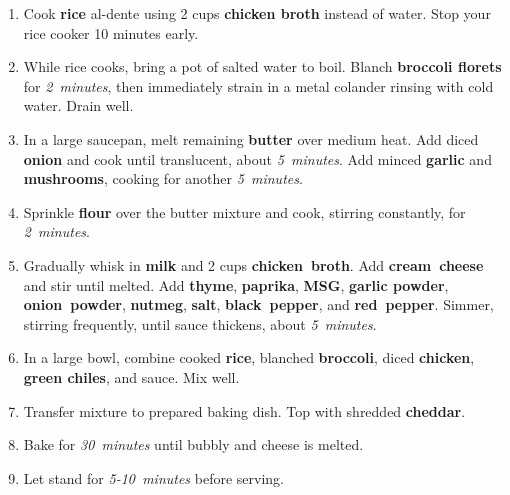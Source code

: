 \documentclass[11pt,letterpaper]{article}
\begin{document}
\begin{enumerate}
    \item Cook \textbf{rice} al-dente using 2 cups \textbf{chicken broth} instead of water. Stop your rice cooker 10 minutes early.
    
    \item While rice cooks, bring a pot of salted water to boil. Blanch \textbf{broccoli florets} for \textit{2~minutes}, then immediately strain in a metal colander rinsing with cold water. Drain well.
    
    \item In a large saucepan, melt remaining \textbf{butter} over medium heat. Add diced \textbf{onion} and cook until translucent, about \textit{5~minutes}. Add minced \textbf{garlic} and \textbf{mushrooms}, cooking for another \textit{5~minutes}.
    
    \item Sprinkle \textbf{flour} over the butter mixture and cook, stirring constantly, for \textit{2~minutes}.
    
    \item Gradually whisk in \textbf{milk} and 2 cups \textbf{chicken~broth}. Add \textbf{cream~cheese} and stir until melted. Add \textbf{thyme}, \textbf{paprika}, \textbf{MSG}, \textbf{garlic powder}, \textbf{onion~powder}, \textbf{nutmeg}, \textbf{salt},  \textbf{black~pepper}, and \textbf{red~pepper}. Simmer, stirring frequently, until sauce thickens, about \textit{5~minutes}.
    
    \item In a large bowl, combine cooked \textbf{rice}, blanched \textbf{broccoli}, diced \textbf{chicken}, \textbf{green chiles}, and sauce. Mix well.
    
    \item Transfer mixture to prepared baking dish. Top with shredded \textbf{cheddar}.
    
    \item Bake for \textit{30~minutes} until bubbly and cheese is melted.
    
    \item Let stand for \textit{5-10~minutes} before serving.
\end{enumerate}

\newpage
\end{document}
